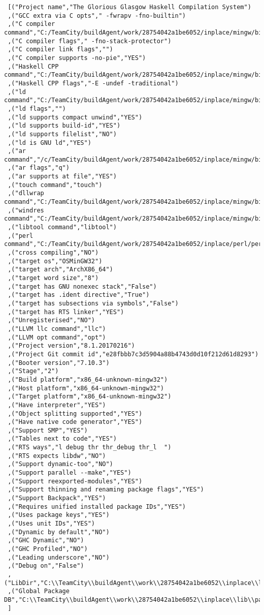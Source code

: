 \begin{verbatim}
 [("Project name","The Glorious Glasgow Haskell Compilation System")
 ,("GCC extra via C opts"," -fwrapv -fno-builtin")
 ,("C compiler command","C:/TeamCity/buildAgent/work/28754042a1be6052/inplace/mingw/bin/gcc.exe")
 ,("C compiler flags"," -fno-stack-protector")
 ,("C compiler link flags","")
 ,("C compiler supports -no-pie","YES")
 ,("Haskell CPP command","C:/TeamCity/buildAgent/work/28754042a1be6052/inplace/mingw/bin/gcc.exe")
 ,("Haskell CPP flags","-E -undef -traditional")
 ,("ld command","C:/TeamCity/buildAgent/work/28754042a1be6052/inplace/mingw/bin/ld.exe")
 ,("ld flags","")
 ,("ld supports compact unwind","YES")
 ,("ld supports build-id","YES")
 ,("ld supports filelist","NO")
 ,("ld is GNU ld","YES")
 ,("ar command","/c/TeamCity/buildAgent/work/28754042a1be6052/inplace/mingw/bin/ar")
 ,("ar flags","q")
 ,("ar supports at file","YES")
 ,("touch command","touch")
 ,("dllwrap command","C:/TeamCity/buildAgent/work/28754042a1be6052/inplace/mingw/bin/dllwrap.exe")
 ,("windres command","C:/TeamCity/buildAgent/work/28754042a1be6052/inplace/mingw/bin/windres.exe")
 ,("libtool command","libtool")
 ,("perl command","C:/TeamCity/buildAgent/work/28754042a1be6052/inplace/perl/perl")
 ,("cross compiling","NO")
 ,("target os","OSMinGW32")
 ,("target arch","ArchX86_64")
 ,("target word size","8")
 ,("target has GNU nonexec stack","False")
 ,("target has .ident directive","True")
 ,("target has subsections via symbols","False")
 ,("target has RTS linker","YES")
 ,("Unregisterised","NO")
 ,("LLVM llc command","llc")
 ,("LLVM opt command","opt")
 ,("Project version","8.1.20170216")
 ,("Project Git commit id","e28fbbb7c3d5904a88b4743d0d10f212d61d8293")
 ,("Booter version","7.10.3")
 ,("Stage","2")
 ,("Build platform","x86_64-unknown-mingw32")
 ,("Host platform","x86_64-unknown-mingw32")
 ,("Target platform","x86_64-unknown-mingw32")
 ,("Have interpreter","YES")
 ,("Object splitting supported","YES")
 ,("Have native code generator","YES")
 ,("Support SMP","YES")
 ,("Tables next to code","YES")
 ,("RTS ways","l debug thr thr_debug thr_l  ")
 ,("RTS expects libdw","NO")
 ,("Support dynamic-too","NO")
 ,("Support parallel --make","YES")
 ,("Support reexported-modules","YES")
 ,("Support thinning and renaming package flags","YES")
 ,("Support Backpack","YES")
 ,("Requires unified installed package IDs","YES")
 ,("Uses package keys","YES")
 ,("Uses unit IDs","YES")
 ,("Dynamic by default","NO")
 ,("GHC Dynamic","NO")
 ,("GHC Profiled","NO")
 ,("Leading underscore","NO")
 ,("Debug on","False")
 ,("LibDir","C:\\TeamCity\\buildAgent\\work\\28754042a1be6052\\inplace\\lib")
 ,("Global Package DB","C:\\TeamCity\\buildAgent\\work\\28754042a1be6052\\inplace\\lib\\package.conf.d")
 ]
\end{verbatim}
